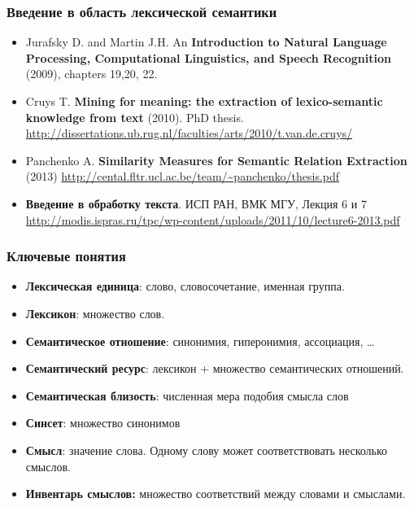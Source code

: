 \begin{frame}
\frametitle{Введение в область лексической семантики}

\begin{itemize}
  \item Jurafsky D. and Martin J.H. An \textbf{Introduction to Natural Language Processing, Computational Linguistics, and Speech Recognition} (2009), chapters 19,20, 22.

\item Cruys T. \textbf{Mining for meaning: the extraction of lexico-semantic knowledge from text} (2010). PhD thesis. \url{http://dissertations.ub.rug.nl/faculties/arts/2010/t.van.de.cruys/} 

\item Panchenko A. \textbf{Similarity Measures for Semantic Relation Extraction} (2013) \url{http://cental.fltr.ucl.ac.be/team/~panchenko/thesis.pdf} 

\item \textbf{Введение в обработку текста}. ИСП РАН, ВМК МГУ, Лекция 6 и 7 \url{http://modis.ispras.ru/tpc/wp-content/uploads/2011/10/lecture6-2013.pdf} 

\end{itemize}


\end{frame}




\begin{frame}
\frametitle{Ключевые понятия}

\begin{itemize}
  \item \textbf{Лексическая единица}: слово, словосочетание, именная группа.
  \item \textbf{Лексикон}: множество слов. 
  \item \textbf{Семантическое отношение}: синонимия, гиперонимия, ассоциация, \ldots
  \item \textbf{Семантический ресурс}: лексикон + множество семантических отношений. 
  \item \textbf{Семантическая близость}: численная мера подобия смысла слов
  \item \textbf{Синсет}: множество синонимов
  \item \textbf{Смысл}: значение слова. Одному слову может соответствовать несколько смыслов.
  \item \textbf{Инвентарь смыслов:} множество соответствий между словами и смыслами. 
\end{itemize}


\end{frame}



